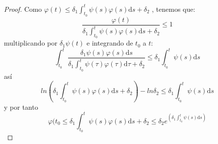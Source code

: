 \begin{proof}
Como $\varphi(t)\leq \delta_1\int_{t_0}^{t}\psi(s)\varphi(s)\mathrm{d}s +\delta_2$ , tenemos que:
$$
\frac{\varphi(t)}{\delta_1\int_{t_0}^{t}\psi(s)\varphi(s)\mathrm{d}s +\delta_2}\leq 1
$$
multiplicando por $\delta_1\psi(t)$ e integrando de $t_0$ a $t$:
$$
\int_{t_0}^{t}\frac{\delta_1\psi(s)\varphi(s)\mathrm{d}s}{\delta_1\int_{t_0}^{t}\psi(\tau)\varphi(\tau)\mathrm{d}\tau +\delta_2}\leq \delta_1\int_{t_0}^{t}\psi(s)\mathrm{d}s
$$
así
$$
ln(\delta_1\int_{t_0}^t\psi(s)\varphi(s)\mathrm{d}s+\delta_2)-ln\delta_2\leq\delta_1\int_{t_0}^t\psi(s)\mathrm{d}s
$$
y por tanto
$$
\varphi(t_0\leq\delta_1\int_{t_0}^t\psi(s)\varphi(s)\mathrm{d}s+\delta_2\leq\delta_2e^{(\delta_1\int_{t_0}^t\psi(s)\mathrm{d}s)}
$$
\end{proof}
